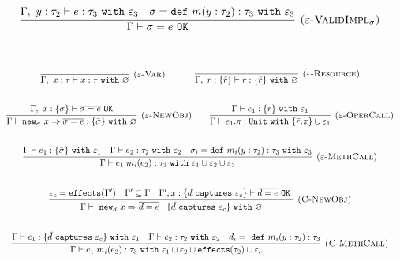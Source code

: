 \documentclass{llncs}
\newcommand{\keywadj}[1]{\mathtt{#1}}
\newcommand{\keyw}[1]{\keywadj{#1}~}
\newcommand{\type}[2]{
	#1~\keyw{with} #2
}
\newcommand{\newsig}[0]{
	\keywadj{new}_\sigma~x \Rightarrow \overline{\sigma = e}
}
\begin{document}
\[
\begin{array}{c}
\infer[\textsc{($\varepsilon$-ValidImpl$_\sigma$)}]
	{\Gamma \vdash \sigma = e~\keywadj{OK}}
	{\Gamma,~y:\tau_2 \vdash e: \tau_3~\keyw{with} \varepsilon_3 & \sigma = \keyw{def} m(y:\tau_2):\tau_3~\keyw{with} \varepsilon_3} \\[5ex]
\end{array}
\]


\noindent
\fbox{$\Gamma \vdash e : \tau~\keyw{with} \varepsilon$}

\[
\begin{array}{c}
	\infer[\textsc{($\varepsilon$-Var)}]
  {\Gamma,~x:\tau \vdash x: \type{\tau}{\varnothing} }
  {} 
~~~~~~~~~~
\infer[\textsc{($\varepsilon$-Resource)}]
  {\Gamma,~r :\{\bar r\} \vdash r: \type{   \{ \bar r \}  }{\varnothing}}
  {} \\[5ex]

\infer[\textsc{($\varepsilon$-NewObj)}]
	{\Gamma \vdash \newsig : \{ \bar \sigma \}~\keyw{with} \varnothing}
	{\Gamma,~x : \{ \bar \sigma \} \vdash \overline{\sigma = e}~\keywadj{OK}} ~~~~~~

\infer[\textsc{($\varepsilon$-OperCall)}]
	{\Gamma \vdash e_1.\pi : \keyw{Unit} \keyw{with} \{ \bar r.\pi \} \cup \varepsilon_1}
	{\Gamma \vdash e_1 : \{ \bar r \}~ \keyw{with} \varepsilon_1} \\[5ex]
	
\infer[\textsc{($\varepsilon$-MethCall)}]
	{\Gamma \vdash e_1.m_i(e_2):\tau_3~\keyw{with} \varepsilon_1 \cup \varepsilon_2 \cup \varepsilon_3}
	{\Gamma \vdash e_1 : \{ \bar \sigma \}~\keyw{with} \varepsilon_1 & \Gamma \vdash e_2 : \tau_2~\keyw{with} \varepsilon_2 & \sigma_i = \keyw{def} m_i(y:\tau_2):\tau_3~\keyw{with} \varepsilon_3} \\[5ex]
	
\infer[\textsc{(C-NewObj)}]
	{\Gamma \vdash~\keywadj{new}_d~x \Rightarrow \overline{d = e} : \{  \bar d~\keyw{captures} \varepsilon_c \} ~\keyw{with} \varnothing }
	{\varepsilon_c = \keywadj{effects}(\Gamma') & \Gamma' \subseteq \Gamma & \Gamma', x : \{ \bar d~\keyw {captures} \varepsilon_c \} \vdash \overline{d = e}~\keyw{OK}} \\[5ex]
	
\infer[\textsc{(C-MethCall)}]
	{\Gamma \vdash e_1.m_i(e_2) : \tau_3~ \keyw{with} \varepsilon_1 \cup \varepsilon_2 \cup \keywadj{effects}(\tau_2) \cup \varepsilon_c}
	{\Gamma \vdash e_1 : \{ \bar d~\keyw{captures} \varepsilon_c \}~\keyw{with} \varepsilon_1 & \Gamma \vdash e_2:\tau_2~\keyw{with} \varepsilon_2&d_i =~\keyw{def} m_i(y:\tau_2):\tau_3 } \\[5ex]

\end{array}
\]
\end{document}
